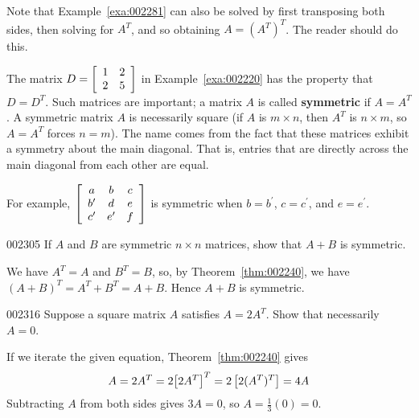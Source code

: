 \noindent Note that Example~\ref{exa:002281} can also be solved by first transposing both sides, then solving for $A^{T}$, and so obtaining $A = (A^{T})^{T}$. The reader should do this.

The matrix $D = \left[ \begin{array}{rr}
1 & 2 \\
2 & 5 \end{array}\right]$ in Example~\ref{exa:002220} has the property that $D = D^{T}$. Such matrices are important; a matrix $A$ is called \textbf{symmetric} if $A = A^{T}$. A symmetric matrix $A$ is necessarily square (if $A$ is $m \times n$, then $A^{T}$ is $n \times m$, so $A = A^{T}$ forces $n = m$). The name comes from the fact that these matrices exhibit a symmetry about the main diagonal. That is, entries that are directly across the main diagonal from each other are equal.

For example, $\left[ \begin{array}{ccc}
a & b & c \\
b^\prime & d & e \\
c^\prime & e^\prime & f
\end{array} \right]$ is symmetric when $b = b^\prime$, $c = c^\prime$, and $e = e^\prime$.

\newpage
\begin{example}{}{002305}
If $A$ and $B$ are symmetric $n \times n$ matrices, show that $A + B$ is symmetric.


\begin{solution}
  We have $A^{T} = A$ and $B^{T} = B$, so, by Theorem~\ref{thm:002240}, we have $(A + B)^{T} = A^{T} + B^{T} = A + B$. Hence $A + B$ is symmetric.
\end{solution}
\end{example}

\begin{example}{}{002316}
Suppose a square matrix $A$ satisfies $A = 2A^{T}$. Show that necessarily $A = 0$.


\begin{solution}
  If we iterate the given equation, Theorem~\ref{thm:002240} gives
\begin{equation*}
A = 2A^{T} = 2 {\left[ 2A^{T} \right]}^T = 2 \left[ 2(A^{T})^{T} \right] = 4A
\end{equation*}
Subtracting $A$ from both sides gives $3A = 0$, so $A = \frac{1}{3}(0) = 0$.
\end{solution}
\end{example}

